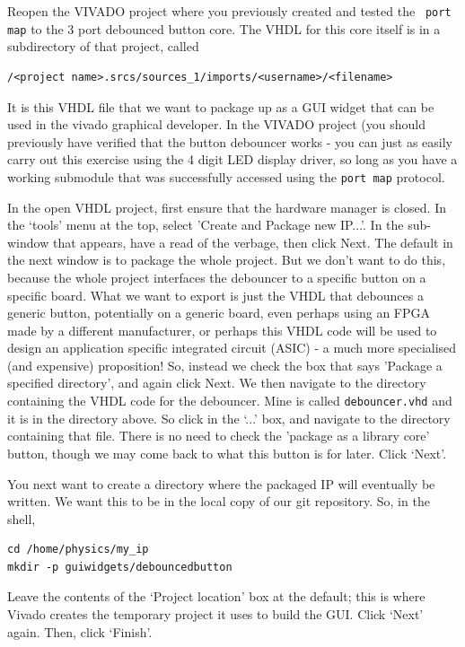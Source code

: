 \documentclass[../physical_computing.tex]{subfiles}
\begin{document}
Reopen the VIVADO project where you previously created and tested the \texttt{ port map} to the 3 port debounced button core. The VHDL for this core itself is in a subdirectory of that project, called
\begin{verbatim}
/<project name>.srcs/sources_1/imports/<username>/<filename> 
\end{verbatim}
It is this VHDL file that we want to package up as a GUI widget that can be used in the vivado graphical developer. In the VIVADO project (you should previously have verified that the button debouncer works - you can just as easily carry out this exercise using the 4 digit LED display driver, so long as you have a working submodule that was successfully accessed using the \texttt{port map} protocol.

In the open VHDL project, first ensure that the hardware manager is closed. In the `tools' menu at the top, select 'Create and Package new IP...'. In the sub-window that appears, have a read of the verbage, then click Next. The default in the next window is to package the whole project. But we don't want to do this, because the whole project interfaces the debouncer to a specific button on a specific board. What we want to export is just the VHDL that debounces a generic button, potentially on a generic board, even perhaps using an FPGA made by a different manufacturer, or perhaps this VHDL code will be used to design an application specific integrated circuit (ASIC) - a much more specialised (and expensive) proposition! So, instead we check the box that says
'Package a specified directory', and again click Next. We then navigate to the directory containing the VHDL code for the debouncer. Mine is called \texttt{debouncer.vhd} and it is in the directory above. So click in the `...' box, and navigate to the directory containing that file. There is no need to check the 'package as a library core' button, though we may come back to what this button is for later. Click `Next'.

You next want to create a directory where the packaged IP will eventually be written. We want this to be in the local copy of our git repository. So, in the shell, 
\begin{verbatim}
cd /home/physics/my_ip
mkdir -p guiwidgets/debouncedbutton
\end{verbatim}

Leave the contents of the `Project location' box at the default; this is where Vivado creates the temporary project it uses to build the GUI.
Click `Next' again. Then, click `Finish'.
\end{document}

